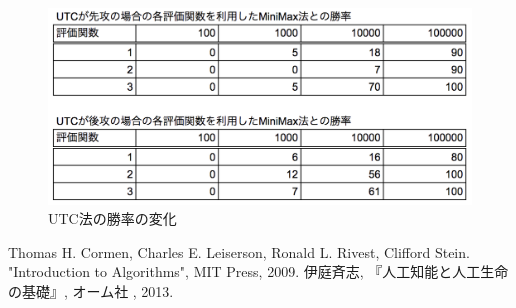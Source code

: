 \documentclass[uplatex]{jsarticle}
\begin{document}
\begin{figure}
  \begin{center}
    \includegraphics[width=15cm]{img/table.png}
    \caption{UTC法の勝率の変化}
  \end{center}
\end{figure}





\begin{thebibliography}{9}
   Thomas H. Cormen, Charles E. Leiserson, Ronald L. Rivest, Clifford Stein.
    "Introduction to Algorithms", MIT Press, 2009.
   伊庭斉志,
    『人工知能と人工生命の基礎』, オーム社 , 2013.
\end{thebibliography}
\end{document}
